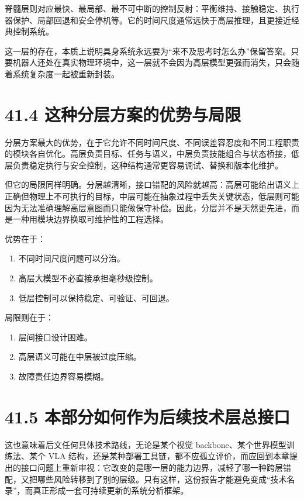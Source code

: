 脊髓层则对应最快、最局部、最不可中断的控制反射：平衡维持、接触稳定、执行器保护、局部回退和安全停机等。它的时间尺度通常远快于高层推理，且更接近经典控制系统。

这一层的存在，本质上说明具身系统永远要为“来不及思考时怎么办”保留答案。只要机器人还处在真实物理环境中，这一层就不会因为高层模型更强而消失，只会随着系统复杂度一起被重新封装。

\section*{41.4 这种分层方案的优势与局限}


分层方案最大的优势，在于它允许不同时间尺度、不同误差容忍度和不同工程职责的模块各自优化。高层负责目标、任务与语义，中层负责技能组合与状态桥接，低层负责稳定执行与安全控制，这种结构通常更容易调试、替换和版本化维护。

但它的局限同样明确。分层越清晰，接口错配的风险就越高：高层可能给出语义上正确但物理上不可执行的目标，中层可能在抽象过程中丢失关键状态，低层则可能因为无法准确理解高层意图而只能做保守补偿。因此，分层并不是天然更先进，而是一种用模块边界换取可维护性的工程选择。

优势在于：

\begin{enumerate}
\item 不同时间尺度问题可以分治。
\item 高层大模型不必直接承担毫秒级控制。
\item 低层控制可以保持稳定、可验证、可回退。
\end{enumerate}

局限则在于：

\begin{enumerate}
\item 层间接口设计困难。
\item 高层语义可能在中层被过度压缩。
\item 故障责任边界容易模糊。
\end{enumerate}

\section*{41.5 本部分如何作为后续技术层总接口}


这也意味着后文任何具体技术路线，无论是某个视觉 backbone、某个世界模型训练法、某个 VLA 结构，还是某种部署工具链，都不应孤立评价，而应回到本章提出的接口问题上重新审视：它改变的是哪一层的能力边界，减轻了哪一种跨层错配，又把哪些风险转移到了别的层级。只有这样，这份报告才能避免变成“技术名录”，而真正形成一套可持续更新的系统分析框架。

